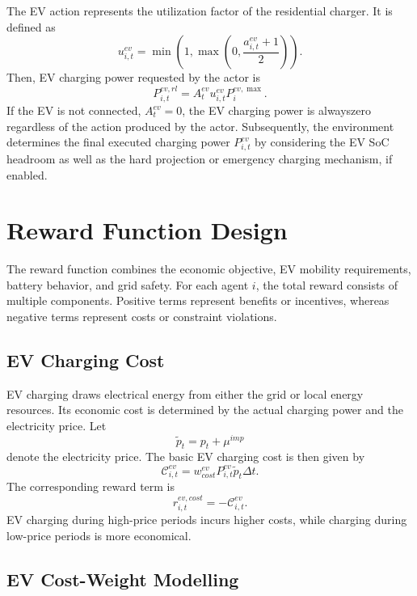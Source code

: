 The EV action represents the utilization factor of the residential charger. It is defined as
\[
  u^{ev}_{i,t}
  =
  \min
  \left(
  1,\max\left(0,\frac{a^{ev}_{i,t}+1}{2}\right)
  \right).
\]
Then, EV charging power requested by the actor is
\[
  P^{ev,rl}_{i,t}
  =
  A^{ev}_t u^{ev}_{i,t}P^{ev,\max}_i.
\]
If the EV is not connected, \(A^{ev}_t=0\), the EV charging power is alwayszero regardless of the action produced by the actor. Subsequently, the environment determines the final executed charging power \(P^{ev}_{i,t}\) by considering the EV SoC headroom as well as the hard projection or emergency charging mechanism, if enabled.

\section{Reward Function Design}

The reward function combines the economic objective, EV mobility requirements, battery behavior, and grid safety. For each agent \(i\), the total reward consists of multiple components. Positive terms represent benefits or incentives, whereas negative terms represent costs or constraint violations.

\subsection{EV Charging Cost}

EV charging draws electrical energy from either the grid or local energy resources. Its economic cost is determined by the actual charging power and the electricity price. Let
\[
  \tilde p_t=p_t+\mu^{imp}
\]
denote the electricity price. The basic EV charging cost is then given by
\[
  \mathcal{C}^{ev}_{i,t}
  =
  w^{ev}_{cost}P^{ev}_{i,t}\tilde p_t\Delta t.
\]
The corresponding reward term is
\[
  r^{ev,cost}_{i,t}=-\mathcal{C}^{ev}_{i,t}.
\]
EV charging during high-price periods incurs higher costs, while charging during low-price periods is more economical.

\subsection{EV Cost-Weight Modelling}

